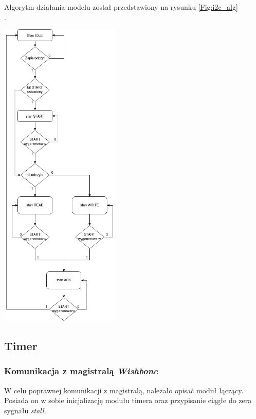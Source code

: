 \documentclass[11pt,a4paper]{article}
\begin{document}
	Algorytm działania modelu został przedstawiony na rysunku \ref{Fig:i2c_alg}\\.
	\begin{minipage}[c]{\textwidth}
	\begin{center}
	

					\includegraphics[height=15cm]{./rysunki/i2c_alg.png}
	\end{center}	
	\end{minipage} 

	\subsection{Timer}
		\subsubsection{Komunikacja z magistralą \textit{Wishbone}}
\hspace{5mm} W celu poprawnej komunikacji z magistralą, należało opisać moduł łączący. Posiada on w sobie inicjalizację modułu timera oraz przypisanie ciągłe do zera sygnału \textit{stall}.
\end{document}
